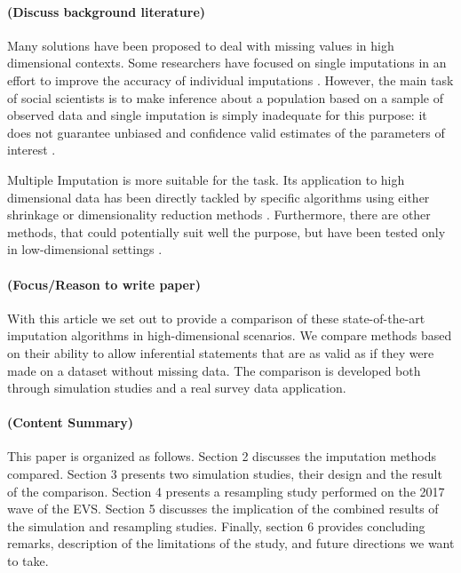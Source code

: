 \paragraph{(Discuss background literature)}
Many solutions have been proposed to deal with missing values in high dimensional contexts. Some researchers
have focused on single imputations in an effort to improve the accuracy of individual imputations \citep{kimEtAl:2005, 
stekhovenBuhlmann:2011, d'ambrosioEtAl:2012}. 
However, the main task of social scientists is to make inference about a population based on a sample of observed 
data and single imputation is simply inadequate for this purpose: it does not guarantee unbiased and confidence 
valid estimates of the parameters of interest \citep{rubin:1996}.

Multiple Imputation is more suitable for the task. Its application to high dimensional data has been directly tackled 
by specific algorithms using either shrinkage or dimensionality reduction methods
\citep{songBelin:2004, zhaoLong:2016, dengEtAl:2016}. 
Furthermore, there are other methods, that could potentially suit well the purpose, but have been tested only in 
low-dimensional settings \citep{burgetteReiter:2010, dooveEtAl:2014, howardEtAl:2015}.

\paragraph{(Focus/Reason to write paper)}
With this article we set out to provide a comparison of these state-of-the-art imputation algorithms in 
high-dimensional scenarios. We compare methods based on their ability to allow inferential statements that 
are as valid as if they were made on a dataset without missing data.
The comparison is developed both through simulation studies and a real survey data application.

\paragraph{(Content Summary)}
This paper is organized as follows. 
Section 2 discusses the imputation methods compared.
Section 3 presents two simulation studies, their design and the result of the comparison.
Section 4 presents a resampling study performed on the 2017 wave of the EVS.
Section 5 discusses the implication of the combined results of the simulation and resampling studies.
Finally, section 6 provides concluding remarks, description of the limitations of the study, and  
future directions we want to take.
